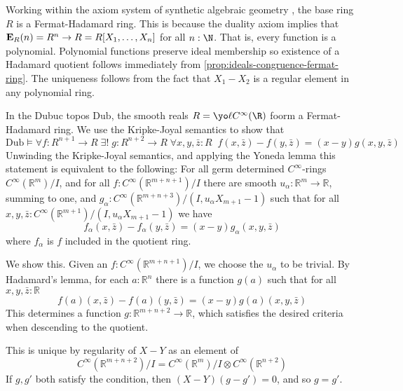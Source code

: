 {\begin{example}
  Working within the axiom system of synthetic algebraic geometry \cite{draft}, the base ring \(R\) is a Fermat-Hadamard ring.
  This is because the duality axiom implies that \(\mathbf{E}_R(n) = R^n \to R = R[X_1, \ldots, X_n]\) for all \(n : \N\).
  That is, every function is a polynomial.
  Polynomial functions preserve ideal membership so existence of a Hadamard quotient follows immediately from \ref{prop:ideals-congruence-fermat-ring}.
  The uniqueness follows from the fact that \(X_1 - X_2\) is a regular element in any polynomial ring.
\end{example}

\begin{example}
  In the Dubuc topos \(\mathrm{Dub}\), the smooth reals \(R = \yo \ell C^\infty(\R)\) foorm a Fermat-Hadamard ring.
  We use the Kripke-Joyal semantics to show that 
  \[ \mathrm{Dub} \models \forall f : R^{n+1} \to R \; 
                          \exists ! \; g : R^{n+2} \to R  \;
                          \forall x, y , \bar{z}  : R \; \;
                           f(x, \bar{z}) - f(y, \bar{z}) = (x-y)g(x,y,\bar{z})\]
  Unwinding the Kripke-Joyal semantics, and applying the Yoneda lemma this statement is equivalent to the following:
  For all germ determined \(C^\infty\)-rings \(C^\infty(\mathbb{R}^m)/I\), and for all \(f : C^{\infty}(\mathbb{R}^{m+n+1})/I\) there are smooth \(u_{\alpha}: \mathbb{R}^{m}\to \mathbb{R}\), summing to one, 
  and \(g_{\alpha}: C^\infty(\mathbb{R}^{m+n+3})/(I, u_{\alpha}X_{m+1}-1)\) such that for all \(x,y,\bar z : C^\infty(\mathbb{R}^{m+1})/(I, u_{\alpha}X_{m+1}-1)\) we have 
  \[f_\alpha(x, \bar{z}) - f_\alpha(y, \bar{z}) = (x-y)g_\alpha(x,y,\bar{z})\] 
  where \(f_\alpha\) is \(f\) included in the quotient ring.

We show this. Given an \(f : C^\infty(\mathbb{R}^{m+n+1})/I\), we choose the \(u_\alpha\) to be trivial.
By Hadamard's lemma, for each \(a : \mathbb{R}^n\) there is a function \(g(a)\) such that for all \(x, y, \bar{z} : \mathbb{R}\) 
\[f(a)(x, \bar{z}) - f(a)(y, \bar{z}) = (x-y)g(a)(x,y,\bar{z})\]
This determines a function \(g : \mathbb{R}^{m+n+2} \to \mathbb{R}\), which satisfies the desired criteria when descending to the quotient.

This is unique by regularity of \(X-Y\) as an element of \[C^\infty(\mathbb{R}^{m+n+2})/I = C^\infty(\mathbb{R}^m)/I \otimes C^\infty(\mathbb{R}^{n+2})\]
If $g, g'$ both satisfy the condition, then $(X-Y)(g-g') = 0$, and so $g = g'$.
\end{example}

}
